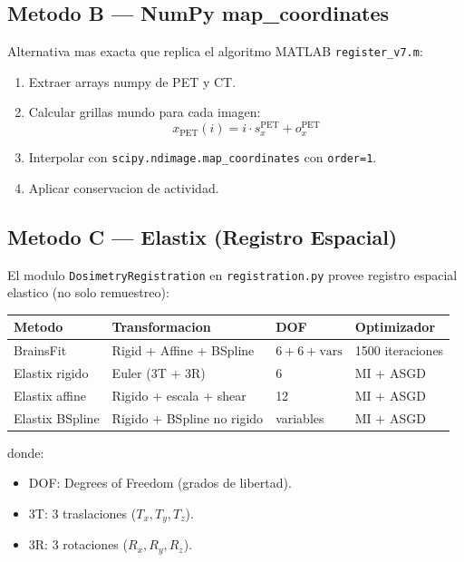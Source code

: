 \documentclass[12pt,a4paper]{article}
\begin{document}
\subsection{Metodo B --- NumPy map\_coordinates}

Alternativa mas exacta que replica el algoritmo MATLAB \texttt{register\_v7.m}:

\begin{enumerate}
    \item Extraer arrays numpy de PET y CT.
    \item Calcular grillas mundo para cada imagen:
          \begin{equation}\label{eq:grilla_mundo}
              x_{\text{PET}}(i) = i \cdot s_x^{\text{PET}} + o_x^{\text{PET}}
          \end{equation}
    \item Interpolar con \texttt{scipy.ndimage.map\_coordinates} con \texttt{order=1}.
    \item Aplicar conservacion de actividad.
\end{enumerate}

\subsection{Metodo C --- Elastix (Registro Espacial)}

El modulo \texttt{DosimetryRegistration} en \texttt{registration.py} provee registro espacial
elastico (no solo remuestreo):

\begin{table}[H]
\centering
\begin{tabular}{l l l l}
\toprule
\textbf{Metodo} & \textbf{Transformacion} & \textbf{DOF} & \textbf{Optimizador} \\
\midrule
BrainsFit & Rigid + Affine + BSpline & $6 + 6 + \text{vars}$ & 1500 iteraciones \\
Elastix rigido & Euler (3T + 3R) & 6 & MI + ASGD \\
Elastix affine & Rigido + escala + shear & 12 & MI + ASGD \\
Elastix BSpline & Rigido + BSpline no rigido & variables & MI + ASGD \\
\bottomrule
\end{tabular}
\end{table}

donde:
\begin{itemize}
    \item DOF: Degrees of Freedom (grados de libertad).
    \item 3T: 3 traslaciones ($T_x, T_y, T_z$).
    \item 3R: 3 rotaciones ($R_x, R_y, R_z$).
\end{itemize}
\end{document}
